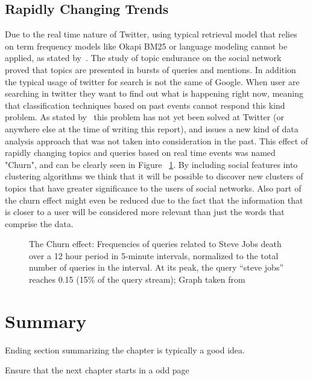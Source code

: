 \subsection{Rapidly Changing Trends} 
\label{sub:real_time_}
Due to the real time nature of Twitter, using typical retrieval model that relies on term frequency models like Okapi BM25 or language modeling cannot be applied, as stated by~\citet{Lin2012}. The study of topic endurance on the social network proved that topics are presented in bursts of queries and mentions. In addition the typical usage of twitter for search is not the same of Google. When user are searching in twitter they want to find out what is happening right now, meaning that classification techniques based on past events cannot respond this kind problem. As stated by~\citet{Lin2012} this problem has not yet been solved at Twitter (or anywhere else at the time of writing this report), and issues a new kind of data analysis approach that was not taken into consideration in the past. 
This effect of rapidly changing topics and queries based on real time events was named "Churn", and can be clearly seen in Figure ~\ref{fig:churn}.
By including social features into clustering algorithms we think that it will be possible to discover new clusters of topics that have greater significance to the users of social networks. Also part of the churn effect might even be reduced due to the fact that the information that is closer to a user will be considered more relevant than just the words that comprise the data.  

\begin{figure}[tb]
  \begin{center}
    \noindent{}
  \end{center}
  \caption{The Churn effect: Frequencies of queries related to Steve Jobs death over a 12 hour period in 5-minute intervals, normalized to the total number of queries in the interval. At its peak, the query “steve jobs” reaches 0.15 (15\% of the query stream); Graph taken from~\cite{Lin2012}}
  \label{fig:churn}
\end{figure}


\section{Summary}
Ending section summarizing the chapter is typically a good idea.

Ensure that the next chapter starts in a odd page
\cleardoublepage 
